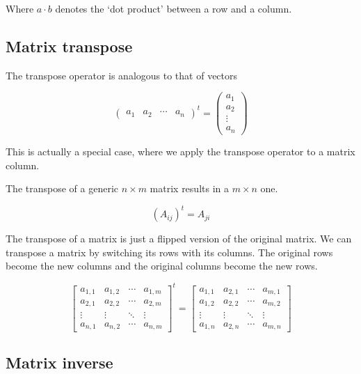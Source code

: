 \documentclass{article}
\begin{document}
Where \(a \cdot b\) denotes the `dot product' between a row and a column.

\subsection{Matrix transpose}

The transpose operator is analogous to that of vectors

\[
    \begin{pmatrix}
        a_1 & a_2 & \cdots & a_n
    \end{pmatrix}^t
    =
    \begin{pmatrix}
        a_1 \\
        a_2 \\
        \vdots \\
        a_n
    \end{pmatrix}
\]

This is actually a special case, where we apply the transpose operator to a matrix column.

The transpose of a generic \(n \times m\) matrix results in a \(m \times n\) one.

\[
    {\left(A_{ij}\right)}^t=A_{ji}
\]

The transpose of a matrix is just a flipped version of the original matrix.
We can transpose a matrix by switching its rows with its columns.
The original rows become the new columns and the original columns become the new rows.

\[
    {\begin{bmatrix} 
        a_{1,1} & a_{1,2} & \cdots & a_{1,m} \\
        a_{2,1} & a_{2,2} & \cdots & a_{2,m} \\
        \vdots  & \vdots  & \ddots & \vdots  \\
        a_{n,1} & a_{n,2} & \cdots & a_{n,m} 
    \end{bmatrix}}^t
    =
    \begin{bmatrix} 
        a_{1,1} & a_{2,1} & \cdots & a_{m,1} \\
        a_{1,2} & a_{2,2} & \cdots & a_{m,2} \\
        \vdots  & \vdots  & \ddots & \vdots  \\
        a_{1,n} & a_{2,n} & \cdots & a_{m,n} 
    \end{bmatrix}
\]

\subsection{Matrix inverse}
\end{document}
